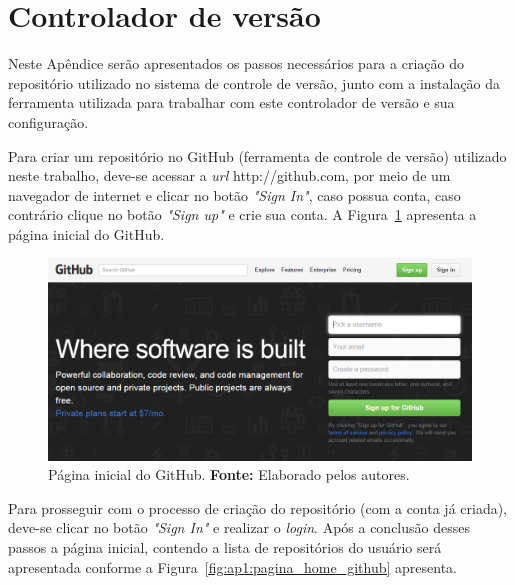 \chapter*{Controlador de versão}
\label{apendice:1}

Neste Apêndice serão apresentados os passos necessários para a criação do repositório utilizado no sistema de controle de versão, junto com a instalação da ferramenta utilizada para trabalhar com este controlador de versão e sua configuração.

Para criar um repositório no GitHub (ferramenta de controle de versão) utilizado neste trabalho, deve-se acessar a  \textit{url} http://github.com, por meio de um navegador de internet e clicar no botão \textit{"Sign In"}, caso possua conta, caso contrário clique no botão \textit{"Sign up"} e crie sua conta. A Figura~\ref{fig:ap1:pagina_inicial_github} apresenta a página inicial do GitHub.

\captionsetup[figure]{list=no}
\begin{figure}[h!]
	\centerline{\includegraphics[scale=0.5]{./imagens/apendices/pagina-inicial-github.png}}
	\caption[Página inicial do GitHub.]
	{Página inicial do GitHub. \textbf{Fonte:} Elaborado pelos autores.}
	\label{fig:ap1:pagina_inicial_github}
\end{figure}

Para prosseguir com o processo de criação do repositório (com a conta já criada), deve-se clicar no botão \textit{"Sign In"} e realizar o \textit{login}. Após a conclusão desses passos a página inicial, contendo a lista de repositórios do usuário será apresentada conforme a Figura~\ref{fig:ap1:pagina_home_github} apresenta.


